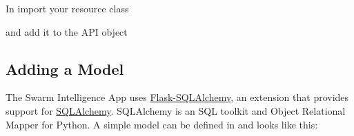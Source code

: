 \documentclass[letterpaper,10pt,english]{sphinxmanual}
\begin{document}
In  import your resource class

\begin{sphinxVerbatim}[commandchars=\\\{\}]
   
\end{sphinxVerbatim}

and add it to the API object

\begin{sphinxVerbatim}[commandchars=\\\{\}]
 
     
\end{sphinxVerbatim}


\subsection{Adding a Model}
\label{\detokenize{developers:adding-a-model}}
The Swarm Intelligence App uses \href{http://flask-sqlalchemy.pocoo.org/2.1/}{Flask-SQLAlchemy}, an extension that provides support for \href{http://www.sqlalchemy.org/}{SQLAlchemy}. SQLAlchemy is an SQL toolkit and Object Relational Mapper for Python. A simple model can be defined in  and looks like this:
\end{document}
